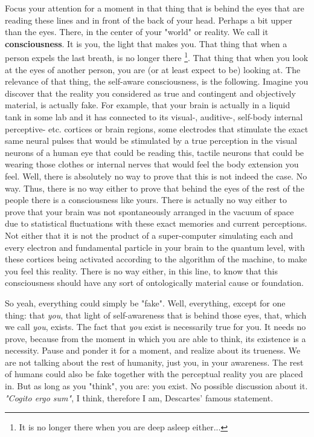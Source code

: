 \documentclass[11pt, a4paper]{article} %
\begin{document}
Focus your attention for a moment in that thing that is behind the eyes that are reading these lines and in front of the back of your head. Perhaps a bit upper than the eyes. There, in the center of your "world" or reality. We call it {\bf consciousness}. It is you, the light that makes you. That thing that when a person expels the last breath, is no longer there \footnote{It is no longer there when you are deep asleep either...}. That thing that when you look at the eyes of another person, you are (or at least expect to be) looking at. The relevance of that thing, the self-aware consciousness, is the following. Imagine you discover that the reality you considered as true and contingent and objectively material, is actually fake. For example, that your brain is actually in a liquid tank in some lab and it has connected to its visual-, auditive-, self-body internal perceptive- etc. cortices or brain regions, some electrodes that stimulate the exact same neural pulses that would be stimulated by a true perception in the visual neurons of a human eye that could be reading this, tactile neurons that could be wearing those clothes or internal nerves that would feel the body extension you feel. Well, there is absolutely no way to prove that this is not indeed the case. No way. Thus, there is no way either to prove that behind the eyes of the rest of the people there is a consciousness like yours. There is actually no way either to prove that your brain was not spontaneously arranged in the vacuum of space due to statistical fluctuations with these exact memories and current perceptions. Not either that it is not the product of a super-computer simulating each and every electron and fundamental particle in your brain to the quantum level, with these cortices being activated according to the algorithm of the machine, to make you feel this reality. There is no way either, in this line, to know that this consciousness should have any sort of ontologically material cause or foundation. \vspace{-0.3cm}

So yeah, everything could simply be "fake". Well, everything, except for one thing: that {\em you}, that light of self-awareness that is behind those eyes, that, which we call {\em you}, exists. The fact that {\em you} exist is necessarily true for you. It needs no prove, because from the moment in which you are able to think, its existence is a necessity. Pause and ponder it for a moment, and realize about its trueness. We are not talking about the rest of humanity, just you, in your awareness. The rest of humans could also be fake together with the perceptual reality you are placed in. But as long as you "think", you are: you exist. No possible discussion about it. {\em "Cogito ergo sum"}, I think, therefore I am, Descartes' famous statement.
\end{document}
